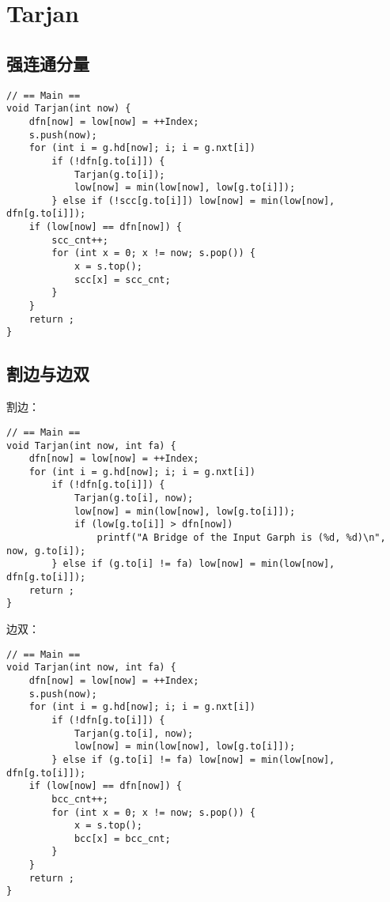 \section{Tarjan}

\subsection{强连通分量}

\begin{verbatim}
// == Main ==
void Tarjan(int now) {
    dfn[now] = low[now] = ++Index;
    s.push(now);
    for (int i = g.hd[now]; i; i = g.nxt[i])
        if (!dfn[g.to[i]]) {
            Tarjan(g.to[i]);
            low[now] = min(low[now], low[g.to[i]]);
        } else if (!scc[g.to[i]]) low[now] = min(low[now], dfn[g.to[i]]);
    if (low[now] == dfn[now]) {
        scc_cnt++;
        for (int x = 0; x != now; s.pop()) {
            x = s.top();
            scc[x] = scc_cnt;
        }
    }
    return ;
}
\end{verbatim}

\subsection{割边与边双}

割边：

\begin{verbatim}
// == Main ==
void Tarjan(int now, int fa) {
    dfn[now] = low[now] = ++Index;
    for (int i = g.hd[now]; i; i = g.nxt[i])
        if (!dfn[g.to[i]]) {
            Tarjan(g.to[i], now);
            low[now] = min(low[now], low[g.to[i]]);
            if (low[g.to[i]] > dfn[now])
                printf("A Bridge of the Input Garph is (%d, %d)\n", now, g.to[i]);
        } else if (g.to[i] != fa) low[now] = min(low[now], dfn[g.to[i]]);
    return ;
}
\end{verbatim}

边双：

\begin{verbatim}
// == Main ==
void Tarjan(int now, int fa) {
    dfn[now] = low[now] = ++Index;
    s.push(now);
    for (int i = g.hd[now]; i; i = g.nxt[i])
        if (!dfn[g.to[i]]) {
            Tarjan(g.to[i], now);
            low[now] = min(low[now], low[g.to[i]]);
        } else if (g.to[i] != fa) low[now] = min(low[now], dfn[g.to[i]]);
    if (low[now] == dfn[now]) {
        bcc_cnt++;
        for (int x = 0; x != now; s.pop()) {
            x = s.top();
            bcc[x] = bcc_cnt;
        }
    }
    return ;
}
\end{verbatim}

